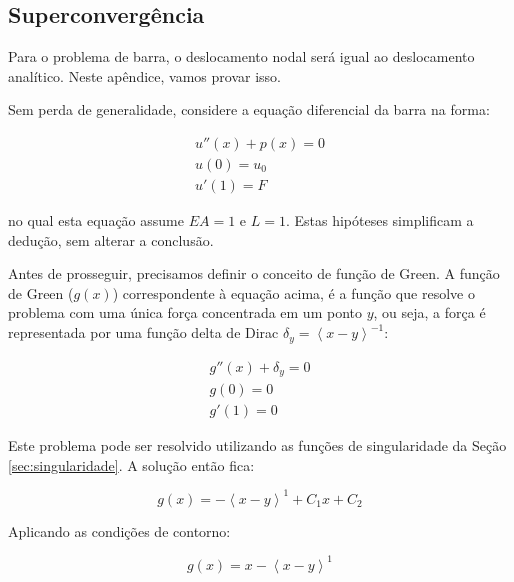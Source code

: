 
\subsection{Superconvergência}
\label{app:superconvergencia}

    Para o problema de barra, o deslocamento nodal será igual ao deslocamento analítico. Neste apêndice, vamos provar isso.

    Sem perda de generalidade, considere a equação diferencial da barra na forma:

    \begin{equation}
        \begin{array}{l}
            u''(x) + p(x) = 0\\
            u(0) = u_0\\
            u'(1) = F
        \end{array}
        \label{eq:fraca_apendice}
    \end{equation}

    \noindent no qual esta equação assume $EA=1$ e $L=1$. Estas hipóteses simplificam a dedução, sem alterar a conclusão.

    Antes de prosseguir, precisamos definir o conceito de função de Green. A função de Green ($g(x)$) correspondente à equação acima, é a função que resolve o problema com uma única força concentrada em um ponto $y$, ou seja, a força é representada por uma função delta de Dirac $\delta_y = \left\langle x-y\right\rangle^{-1}$:


    \begin{equation}
        \begin{array}{l}
            g''(x) + \delta_y = 0\\
            g(0) = 0\\
            g'(1) = 0
        \end{array}
    \end{equation}

    Este problema pode ser resolvido utilizando as funções de singularidade da Seção \ref{sec:singularidade}. A solução então fica:

    \begin{equation*}
        g(x) = -\left\langle x-y\right\rangle^1 + C_1x + C_2
    \end{equation*}

    Aplicando as condições de contorno:

    \begin{equation*}
        g(x) = x-\left\langle x-y\right\rangle^1
    \end{equation*}

